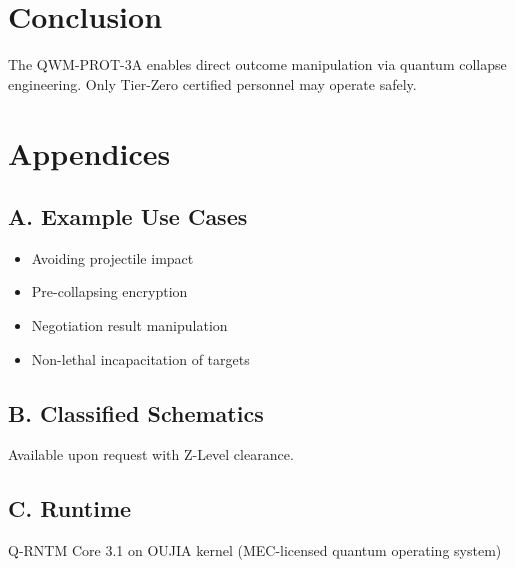 \documentclass[12pt]{article}
\begin{document}
\section{Conclusion}
The QWM-PROT-3A enables direct outcome manipulation via quantum collapse engineering. Only Tier-Zero certified personnel may operate safely.

\section*{Appendices}

\subsection*{A. Example Use Cases}
\begin{itemize}
    \item Avoiding projectile impact
    \item Pre-collapsing encryption
    \item Negotiation result manipulation
    \item Non-lethal incapacitation of targets
\end{itemize}

\subsection*{B. Classified Schematics}
Available upon request with Z-Level clearance.

\subsection*{C. Runtime}
Q-RNTM Core 3.1 on OUJIA kernel (MEC-licensed quantum operating system)
\end{document}
